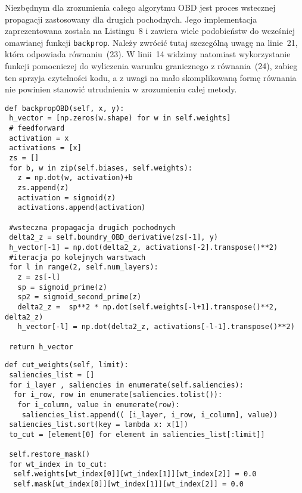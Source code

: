 \par Niezbędnym dla zrozumienia całego algorytmu OBD jest proces wstecznej propagacji zastosowany dla drugich pochodnych. Jego implementacja zaprezentowana została na Listingu~8 i zawiera wiele podobieństw do wcześniej omawianej funkcji \texttt{backprop}. Należy zwrócić tutaj szczególną uwagę na linie~21, która odpowiada równaniu~(23). W linii~14 widzimy natomiast wykorzystanie funkcji pomocniczej do wyliczenia warunku granicznego z równania~(24), zabieg ten sprzyja czytelności kodu, a z uwagi na mało skomplikowaną formę równania nie powinien stanowić utrudnienia w zrozumieniu całej metody.
\begin{listing}[!htb]
\begin{verbatim}
def backpropOBD(self, x, y):       
 h_vector = [np.zeros(w.shape) for w in self.weights]
 # feedforward
 activation = x
 activations = [x] 
 zs = []
 for b, w in zip(self.biases, self.weights):
   z = np.dot(w, activation)+b
   zs.append(z)
   activation = sigmoid(z)
   activations.append(activation)
   
 #wsteczna propagacja drugich pochodnych
 delta2_z = self.boundry_OBD_derivative(zs[-1], y)
 h_vector[-1] = np.dot(delta2_z, activations[-2].transpose()**2)
 #iteracja po kolejnych warstwach
 for l in range(2, self.num_layers):
   z = zs[-l]
   sp = sigmoid_prime(z)
   sp2 = sigmoid_second_prime(z)    
   delta2_z =  sp**2 * np.dot(self.weights[-l+1].transpose()**2, delta2_z)             
   h_vector[-l] = np.dot(delta2_z, activations[-l-1].transpose()**2)
           
 return h_vector
\end{verbatim}
\end{listing}

\begin{listing}[!htb]
\begin{verbatim}
def cut_weights(self, limit):
 saliencies_list = []
 for i_layer , saliencies in enumerate(self.saliencies):
  for i_row, row in enumerate(saliencies.tolist()):
   for i_column, value in enumerate(row):
    saliencies_list.append(( [i_layer, i_row, i_column], value))                    
 saliencies_list.sort(key = lambda x: x[1])
 to_cut = [element[0] for element in saliencies_list[:limit]]
 
 self.restore_mask()
 for wt_index in to_cut:
  self.weights[wt_index[0]][wt_index[1]][wt_index[2]] = 0.0
  self.mask[wt_index[0]][wt_index[1]][wt_index[2]] = 0.0
\end{verbatim}
\end{listing}

